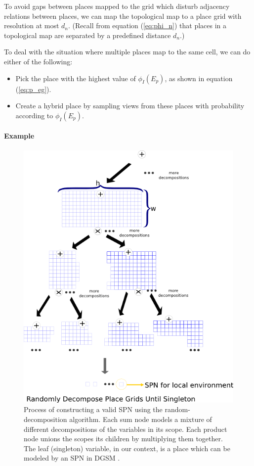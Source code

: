 \documentclass[10pt, titlepage]{article}
\theoremstyle{definition}
\begin{document}
To avoid gaps between places mapped to the grid which disturb adjacency relations between places, we can map the topological map to a place grid with resolution at most $d_n$. (Recall from equation (\ref{eq:phi_n}) that places in a topological map are separated by a predefined distance $d_n$.)\label{sc:avoidgaps}

To deal with the situation where multiple places map to the same cell, we can do either of the following:
\begin{itemize}
\item Pick the place with the highest value of $\phi_I(E_p)$, as shown in equation (\ref{eq:p_eg}). 
\item Create a hybrid place by sampling views from these places with probability according to $\phi_I(E_p)$.
\end{itemize}

\paragraph{Example} 

\begin{figure}[!htb]
    \centering
    \captionsetup{width=.8\linewidth}
    \includegraphics[scale=0.6]{images/spn_grid.png}
    \caption{Process of constructing a valid SPN using the random-decomposition algorithm. Each sum node models a mixture of different decompositions of the variables in its scope. Each product node unions the scopes its children by multiplying them together. The leaf (singleton) variable, in our context, is a place which can be modeled by an SPN in DGSM \cite{pronobis2016learning}.}
    \label{fig:grid_learn}
\end{figure}
\end{document}
